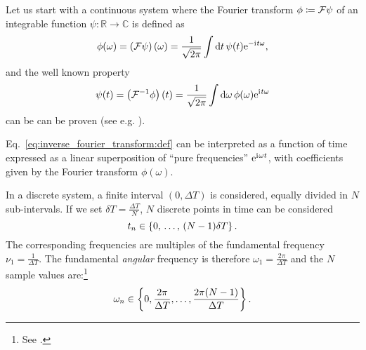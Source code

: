 Let us start with a continuous system where the Fourier transform $\phi \coloneqq \mathcal{F}\psi$ of
an integrable function $\psi: \mathbb{R} \to \mathbb{C}$ is defined as
\begin{equation}\label{eq:fourier_transform:def}
  \phi(\omega) = \left(\mathcal{F}\psi\right) (\omega) =
    \frac{1}{\sqrt{2\pi}} \int \dd{t} \psi(t) \mathrm{e}^{- \mathrm{i}\mkern1mu t \omega} \text{,} 
\end{equation}
and the well known  property
\begin{equation}\label{eq:inverse_fourier_transform:def}
  \psi(t) = \left(\mathcal{F}^{-1} \phi \right) (t) =
    \frac{1}{\sqrt{2\pi}} \int \dd{\omega} \phi(\omega) \mathrm{e}^{\mathrm{i}\mkern1mu t \omega} 
\end{equation}
can be can be proven (see e.g. \cite{Folland:Fourier}).

Eq.~\eqref{eq:inverse_fourier_transform:def} can be interpreted
as a function of time
expressed as a linear superposition
of ``pure frequencies'' $\mathrm{e}^{\mathrm{i}\mkern1mu \omega t}$,
with coefficients given by the Fourier transform $\phi(\omega)$.

In a discrete system, a finite interval $(0, \Delta{T})$ is considered,
equally divided in $N$ sub-intervals. If we set $\delta{T} = \frac{\Delta{T}}{N}$,
$N$ discrete points in time can be considered
\begin{equation}
  t_n \in \left\{0,\,\hdots,\,(N-1)\delta{T}\right\} \text{.}
\end{equation} 
%
The corresponding frequencies are multiples of the fundamental frequency $\nu_1 = \frac{1}{\Delta{T}}$.
The fundamental \emph{angular} frequency is therefore $\omega_1 = \frac{2\pi}{\Delta{T}}$ and the
$N$ sample values are:\footnote{
  See
  \cite[Ch. ``The Discrete Fourier Transform'']{Oppenheim:Int3}.
}
\begin{equation}
  \omega_n \in \left\{0, \frac{2\pi}{\Delta{T}}, \dots, \frac{2\pi(N-1)}{\Delta{T}}\right\} \text{.}
\end{equation} 



